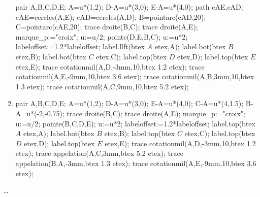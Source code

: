 \begin{exercice*}
\begin{enumerate}
        \begin{Geometrie}[CoinHD={(6u,5u)},CoinBG={(0,0.5u)}]
            pair A,B,C,D,E;
            A=u*(1,2);
            D-A=u*(3,0);
            E-A=u*(4,0);
            path cAE,cAD;
            cAE=cercles(A,E);
            cAD=cercles(A,D);
            B=pointarc(cAD,20);
            C=pointarc(cAE,20);
            trace droite(B,C);
            trace droite(A,E);
            marque_p:="croix";
            u:=u/2;
            pointe(D,E,B,C);
            u:=u*2;
            labeloffset:=1.2*labeloffset;
            label.llft(btex $A$ etex,A);
            label.bot(btex $B$ etex,B);
            label.bot(btex $C$ etex,C);
            label.top(btex $D$ etex,D);
            label.top(btex $E$ etex,E);
            trace cotationmil(A,D,-3mm,10,btex \num{1.2} etex);
            trace cotationmil(A,E,-9mm,10,btex \num{3.6} etex);
            trace cotationmil(A,B,3mm,10,btex \num{1.3} etex);
            trace cotationmil(A,C,9mm,10,btex \num{5.2} etex);            
        \end{Geometrie}
        \item \phantom{rrr}
        
        \begin{Geometrie}[CoinHD={(6u,4u)},CoinBG={(-2u,0)}]
            pair A,B,C,D,E;
            A=u*(1,2);
            D-A=u*(3,0);
            E-A=u*(4,0);
            C-A=u*(4,1.5);
            B-A=u*(-2,-0.75);
            trace droite(B,C);
            trace droite(A,E);
            marque_p:="croix";
            u:=u/2;
            pointe(B,C,D,E);
            u:=u*2;
            labeloffset:=1.2*labeloffset;
            label.top(btex $A$ etex,A);
            label.bot(btex $B$ etex,B);
            label.top(btex $C$ etex,C);
            label.top(btex $D$ etex,D);
            label.top(btex $E$ etex,E);
            trace cotationmil(A,D,-3mm,10,btex \num{1.2} etex);
            trace appelation(A,C,3mm,btex \num{5.2} etex);
            trace appelation(B,A,-3mm,btex \num{1.3} etex);
            trace cotationmil(A,E,-9mm,10,btex \num{3.6} etex);
        \end{Geometrie}
    \end{enumerate}
\end{exercice*}
\begin{corrige}
    \dots
\end{corrige}

